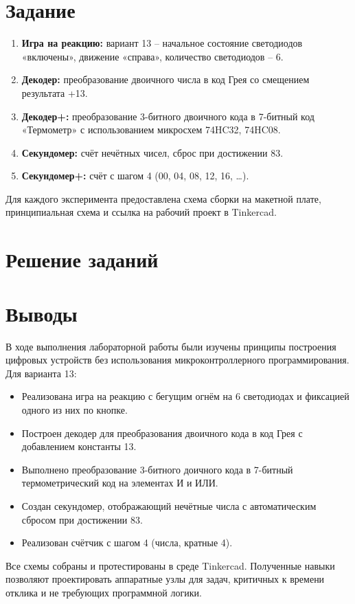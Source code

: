 \documentclass[oneside,a4paper,14pt]{extarticle} %
\begin{document}
	\section*{Задание}
\begin{enumerate}
    \item \textbf{Игра на реакцию:} вариант 13 – начальное состояние светодиодов «включены», движение «справа», количество светодиодов – 6.
    \item \textbf{Декодер:} преобразование двоичного числа в код Грея со смещением результата +13.
    \item \textbf{Декодер+:} преобразование 3-битного двоичного кода в 7-битный код «Термометр» с использованием микросхем 74HC32, 74HC08.
    \item \textbf{Секундомер:} счёт нечётных чисел, сброс при достижении 83.
    \item \textbf{Секундомер+:} счёт с шагом 4 (00, 04, 08, 12, 16, …).
\end{enumerate}
Для каждого эксперимента предоставлена схема сборки на макетной плате, принципиальная схема и ссылка на рабочий проект в Tinkercad.
	\newpage
	\section*{Решение заданий}
	
	\newpage
	\section*{Выводы}

	В ходе выполнения лабораторной работы были изучены принципы построения цифровых устройств без использования микроконтроллерного программирования. Для варианта 13:
\begin{itemize}
    \item Реализована игра на реакцию с бегущим огнём на 6 светодиодах и фиксацией одного из них по кнопке.
    \item Построен декодер для преобразования двоичного кода в код Грея с добавлением константы 13.
    \item Выполнено преобразование 3-битного доичного кода в 7-битный термометрический код на элементах И и ИЛИ.
    \item Создан секундомер, отображающий нечётные числа с автоматическим сбросом при достижении 83.
    \item Реализован счётчик с шагом 4 (числа, кратные 4).
\end{itemize}
Все схемы собраны и протестированы в среде Tinkercad. Полученные навыки позволяют проектировать аппаратные узлы для задач, критичных к времени отклика и не требующих программной логики.
\end{document}
